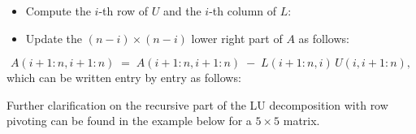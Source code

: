 \begin{itemize}
\item Compute the $i$-th row of $U$ and the $i$-th column of $L$:
\end{itemize}

\begin{center}
\end{center}

\begin{itemize}
\item Update the $(n-i)\times(n-i)$ lower right part of $A$ as follows:
\end{itemize}
\begin{equation}
A(i+1:n,i+1:n) \;=\; A(i+1:n,i+1:n) \;-\; L(i+1:n,i)\,U(i,i+1:n),
\end{equation}
which can be written entry by entry as follows:

\begin{center}
\end{center}

Further clarification on the recursive part of the LU decomposition with row
pivoting can be found in the example below for a $5\times 5$ matrix.

